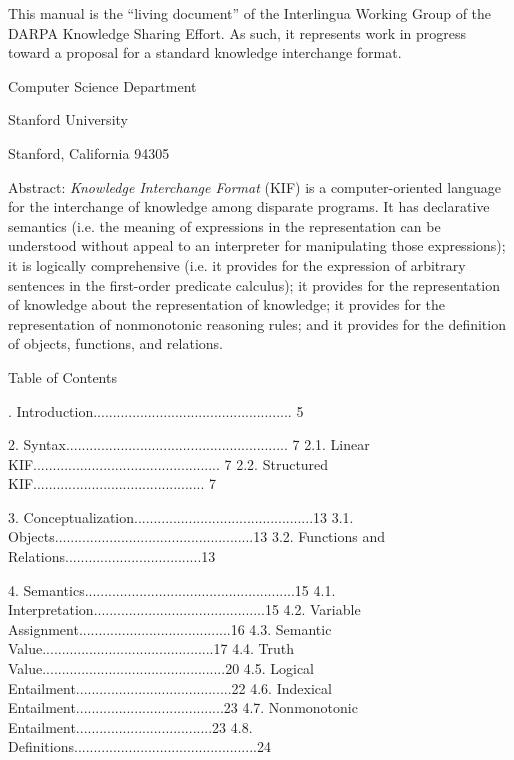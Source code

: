 This manual is the ``living document'' of the Interlingua Working Group of
the DARPA Knowledge Sharing Effort.  As such, it represents work in progress
toward a proposal for a standard knowledge interchange format.

\vfill
\centerline{Computer Science Department}
\centerline{Stanford University}
\centerline{Stanford, California 94305}
\eject

Abstract: {\it Knowledge Interchange Format} (KIF) is a computer-oriented
language for the interchange of knowledge among disparate programs.  It has
declarative semantics (i.e. the meaning of expressions in the representation can be understood without appeal to an interpreter for manipulating those
expressions); it is logically comprehensive (i.e. it provides for the
expression of arbitrary sentences in the first-order predicate calculus); it
provides for the representation of knowledge about the representation of
knowledge; it provides for the representation of nonmonotonic reasoning rules; and it provides for the definition of objects, functions, and relations.  


\vfill\eject

\centerline{\twelvebf Table of Contents}

\medskip

. Introduction................................................... 5

2. Syntax......................................................... 7
   2.1. Linear KIF................................................ 7
   2.2. Structured KIF............................................ 7

3. Conceptualization..............................................13
   3.1. Objects...................................................13
   3.2. Functions and Relations...................................13

4. Semantics......................................................15
   4.1. Interpretation............................................15
   4.2. Variable Assignment.......................................16
   4.3. Semantic Value............................................17
   4.4. Truth Value...............................................20
   4.5. Logical Entailment........................................22
   4.6. Indexical Entailment......................................23
   4.7. Nonmonotonic Entailment...................................23
   4.8. Definitions...............................................24


